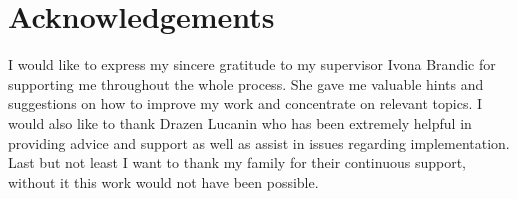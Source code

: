 \chapter*{Acknowledgements}

I would like to express my sincere gratitude to my supervisor Ivona Brandic for supporting me throughout the whole process. She gave me valuable hints and suggestions on how to improve my work and concentrate on relevant topics. I would also like to thank Drazen Lucanin who has been extremely helpful 
in providing advice and support as well as assist in issues regarding implementation. Last but not least I want to thank my family for their continuous support, without it this work would not have been possible. 
